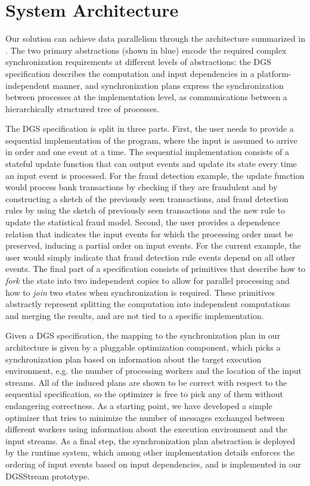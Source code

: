 \section{System Architecture}
\label{dgs:ssec:solution-architecture}

Our solution can achieve data parallelism through the architecture
summarized in .
The two primary abstractions (shown in blue) encode the required complex synchronization requirements at different levels of abstractions:
the DGS specification describes the computation and input dependencies
in a platform-independent manner,
and synchronization plans express the synchronization
between processes at the implementation level,
as communications between a hierarchically structured tree of processes.

The DGS specification is split in three parts.
First, the user
needs to provide a sequential implementation of the program, where the
input is assumed to arrive in order and one event at a time. The
sequential implementation consists of a stateful update function that
can output events and update its state every time an input event is
processed. For the fraud detection example, the update function would
process bank transactions by checking if they are fraudulent and by
constructing a sketch of the previously seen transactions, and fraud
detection rules by using the sketch of previously seen transactions
and the new rule to update the statistical fraud model. Second, the
user provides a dependence relation that indicates the input events
for which the processing order must be preserved, inducing a partial
order on input events. For the current example, the user would simply
indicate that fraud detection rule events depend on all other
events. The final part of a specification consists of primitives that
describe how to \emph{fork} the state into two independent copies to
allow for parallel processing and how to \emph{join} two states when
synchronization is required. These primitives abstractly represent
splitting the computation into independent computations and merging
the results, and are not tied to a specific implementation.

Given a DGS specification,
the mapping to the synchronization plan in our architecture
is given by a pluggable optimization component, which picks
a synchronization plan based on information about the target execution
environment, e.g. the number of processing workers and the location of
the input streams. All of the induced plans are shown to be correct with respect to the sequential specification, so the optimizer is free to pick any of them without endangering correctness. As a starting point, we have developed a simple
optimizer that tries to minimize the number of messages exchanged
between different workers using information about the execution
environment and the input streams.
As a final step, the synchronization plan abstraction
is deployed by the runtime system,
which among other implementation details enforces the ordering of input events based on input dependencies,
and is implemented in our DGSStream prototype.

